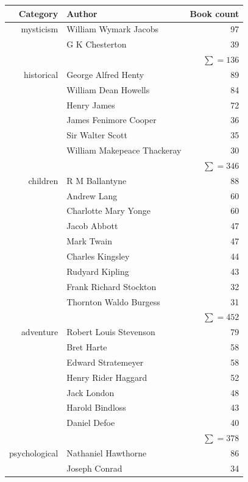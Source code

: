 \documentclass[fleqn]{article}
\begin{document}
\begin{table}[ht]
    \centering
    \begin{tabular}{r|l|r}
        Category & Author & Book count\\
        \hline
        \hline
        mysticism & William Wymark Jacobs & 97 \\
        & G K Chesterton & 39 \\
        & & $\sum = 136$ \\
        \hline
        historical & George Alfred Henty & 89 \\
        & William Dean Howells & 84 \\
        & Henry James & 72 \\
        & James Fenimore Cooper & 36 \\
        & Sir Walter Scott & 35 \\
        & William Makepeace Thackeray & 30 \\
        & & $\sum = 346$ \\
        \hline
        children & R M Ballantyne & 88 \\
        & Andrew Lang & 60 \\
        & Charlotte Mary Yonge & 60 \\
        & Jacob Abbott & 47 \\
        & Mark Twain & 47 \\
        & Charles Kingsley & 44 \\
        & Rudyard Kipling & 43 \\
        & Frank Richard Stockton & 32 \\
        & Thornton Waldo Burgess & 31 \\
        & & $\sum = 452$ \\
        \hline
        adventure & Robert Louis Stevenson & 79 \\
        & Bret Harte & 58 \\
        & Edward Stratemeyer & 58 \\
        & Henry Rider Haggard & 52 \\
        & Jack London & 48 \\
        & Harold Bindloss & 43 \\
        & Daniel Defoe & 40 \\
        & & $\sum = 378$ \\
        \hline
        psychological & Nathaniel Hawthorne & 86 \\
        & Joseph Conrad & 34 \\

\end{tabular}
\end{table}
\end{document}
